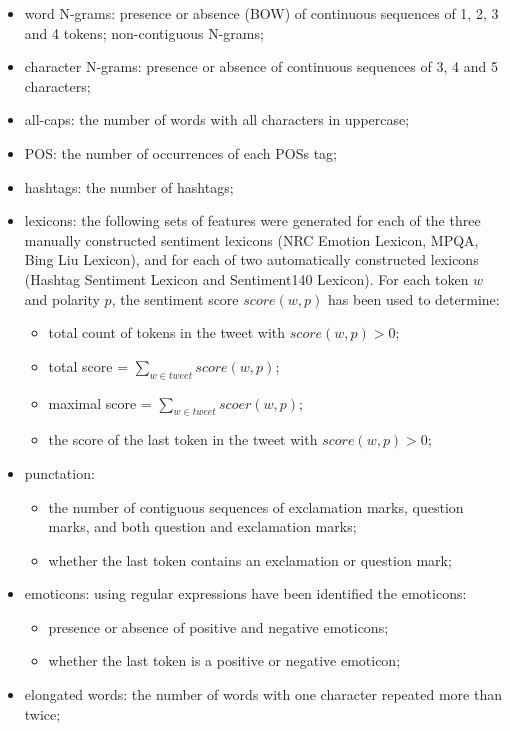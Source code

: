 \begin{itemize}
	\item word N-grams: presence or absence (\ac{BOW}) of continuous sequences of 1, 2, 3 and 4 tokens; non-contiguous N-grams;
	\item character N-grams: presence or absence of continuous sequences of 3, 4 and 5 characters;
	\item all-caps: the number of words with all characters in uppercase;
	\item \ac{POS}: the number of occurrences of each \aclp{POS} tag;
	\item hashtags: the number of hashtags;
	\item lexicons: the following sets of features were generated for each of the three manually constructed sentiment lexicons (NRC Emotion Lexicon, MPQA, Bing Liu Lexicon), and for each of two automatically constructed lexicons (Hashtag Sentiment Lexicon and Sentiment140 Lexicon). For each token $w$ and polarity $p$, the sentiment score $score(w,p)$ has been used to determine:
	\begin{itemize}
		\item total count of tokens in the tweet with $score(w,p)>0$;
		\item total score = $\sum_{w \in tweet} score(w,p)$;
		\item maximal score = $\sum_{w \in tweet} scoer(w,p)$;
		\item the score of the last token in the tweet with $score(w,p)>0$;
	\end{itemize}
	\item punctation:
	\begin{itemize}
		\item the number of contiguous sequences of exclamation marks, question marks, and both question and exclamation marks;
		\item whether the last token contains an exclamation or question mark;
	\end{itemize}
	\item emoticons: using regular expressions have been  identified the emoticons:
	\begin{itemize}
		\item presence or absence of positive and negative emoticons;
		\item whether the last token is a positive or negative emoticon;
	\end{itemize}
	\item elongated words: the number of words with one character repeated more than twice;

\end{itemize}
